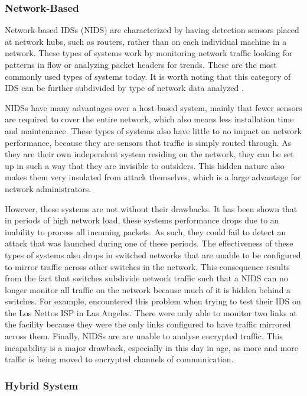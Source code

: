 \documentclass{acm_proc_article-sp}
\begin{document}
    	\subsubsection{Network-Based}
    		Network-based IDSs (NIDS) are characterized by having detection sensors placed at network hubs, such as routers, rather than on each individual machine in a network. These types of systems work by monitoring network traffic looking for patterns in flow or analyzing packet headers for trends. These are the most commonly used types of systems today. It is worth noting that this category of IDS can be further subdivided by type of network data analyzed \cite{Bhuyan2011}. 
    		
    		NIDSs have many advantages over a host-based system, mainly that fewer sensors are required to cover the entire network, which also means less installation time and maintenance. These types of systems also have little to no impact on network performance, because they are sensors that traffic is simply routed through. As they are their own independent system residing on the network, they can be set up in such a way that they are invisible to outsiders. This hidden nature also makes them very insulated from attack themselves, which is a large advantage for network administrators. 
    		
    		However, these systems are not without their drawbacks. It has been shown that in periods of high network load, these systems performance drops due to an inability to process all incoming packets. As such, they could fail to detect an attack that was launched during one of these periods. The effectiveness of these types of systems also drops in switched networks that are unable to be configured to mirror traffic across other switches in the network. This consequence results from the fact that switches subdivide network traffic such that a NIDS can no longer monitor all traffic on the network because much of it is hidden behind a switches. For example, \cite{Hussain2003} encountered this problem when trying to test their IDS on the Los Nettos ISP in Las Angeles. There were only able to monitor two links at the facility because they were the only links configured to have traffic mirrored across them.  Finally, NIDSs are are unable to analyse encrypted traffic. This incapability is a major drawback, especially in this day in age, as more and more traffic is being moved to encrypted channels of communication. 		
    	\subsubsection{Hybrid System}
\end{document}
